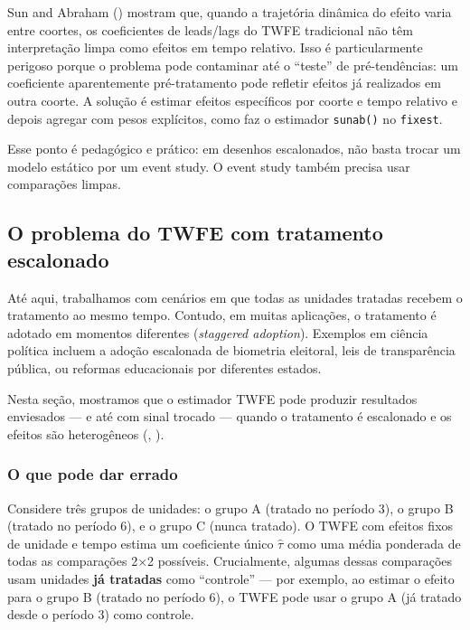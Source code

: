 \documentclass[
]{article}
\begin{document}
Sun and Abraham () mostram que, quando a trajetória dinâmica do efeito varia entre coortes, os coeficientes de leads/lags do TWFE tradicional não têm interpretação limpa como efeitos em tempo relativo. Isso é particularmente perigoso porque o problema pode contaminar até o ``teste'' de pré-tendências: um coeficiente aparentemente pré-tratamento pode refletir efeitos já realizados em outra coorte. A solução é estimar efeitos específicos por coorte e tempo relativo e depois agregar com pesos explícitos, como faz o estimador \texttt{sunab()} no \texttt{fixest}.

Esse ponto é pedagógico e prático: em desenhos escalonados, não basta trocar um modelo estático por um event study. O event study também precisa usar comparações limpas.

\subsection{O problema do TWFE com tratamento escalonado}\label{o-problema-do-twfe-com-tratamento-escalonado}

Até aqui, trabalhamos com cenários em que todas as unidades tratadas recebem o tratamento ao mesmo tempo. Contudo, em muitas aplicações, o tratamento é adotado em momentos diferentes (\emph{staggered adoption}). Exemplos em ciência política incluem a adoção escalonada de biometria eleitoral, leis de transparência pública, ou reformas educacionais por diferentes estados.

Nesta seção, mostramos que o estimador TWFE pode produzir resultados enviesados --- e até com sinal trocado --- quando o tratamento é escalonado e os efeitos são heterogêneos (, ).

\subsubsection{O que pode dar errado}\label{o-que-pode-dar-errado}

Considere três grupos de unidades: o grupo A (tratado no período 3), o grupo B (tratado no período 6), e o grupo C (nunca tratado). O TWFE com efeitos fixos de unidade e tempo estima um coeficiente único \(\hat{\tau}\) como uma média ponderada de todas as comparações 2×2 possíveis. Crucialmente, algumas dessas comparações usam unidades \textbf{já tratadas} como ``controle'' --- por exemplo, ao estimar o efeito para o grupo B (tratado no período 6), o TWFE pode usar o grupo A (já tratado desde o período 3) como controle.
\end{document}

